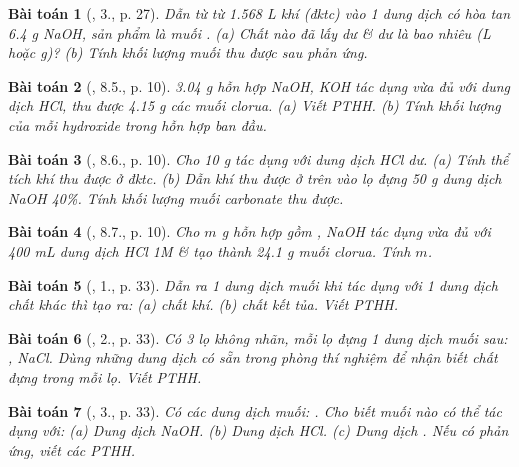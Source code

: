 \documentclass{article}
\newtheorem{baitoan}{Bài toán}
\begin{document}
\begin{baitoan}[\cite{SGK_Hoa_Hoc_9}, 3., p. 27]
	Dẫn từ từ {\rm1.568 L} khí {\rm{}} (đktc) vào 1 dung dịch có hòa tan {\rm6.4 g NaOH}, sản phẩm là muối {\rm{}}. (a) Chất nào đã lấy dư \& dư là bao nhiêu ({\rm L} hoặc {\rm g})? (b) Tính khối lượng muối thu được sau phản ứng.
\end{baitoan}

\begin{baitoan}[\cite{SGK_Hoa_Hoc_9}, 8.5., p. 10]
	{\rm3.04 g} hỗn hợp {\rm NaOH, KOH} tác dụng vừa đủ với dung dịch {\rm HCl}, thu được {\rm4.15 g} các muối clorua. (a) Viết {\rm PTHH}. (b) Tính khối lượng của mỗi hydroxide trong hỗn hợp ban đầu.
\end{baitoan}

\begin{baitoan}[\cite{SGK_Hoa_Hoc_9}, 8.6., p. 10]
	Cho {\rm10 g } tác dụng với dung dịch {\rm HCl} dư. (a) Tính thể tích khí {\rm{}} thu được ở đktc. (b) Dẫn khí {\rm{}} thu được ở trên vào lọ đựng {\rm50 g} dung dịch {\rm NaOH 40\%}. Tính khối lượng muối carbonate thu được.
\end{baitoan}

\begin{baitoan}[\cite{SGK_Hoa_Hoc_9}, 8.7., p. 10]
	Cho $m$ {\rm g} hỗn hợp gồm {\rm{}, NaOH} tác dụng vừa đủ với {\rm400 mL} dung dịch {\rm HCl 1M} \& tạo thành {\rm24.1 g} muối clorua. Tính $m$.
\end{baitoan}

\begin{baitoan}[\cite{SGK_Hoa_Hoc_9}, 1., p. 33]
	Dẫn ra 1 dung dịch muối khi tác dụng với 1 dung dịch chất khác thì tạo ra: (a) chất khí. (b) chất kết tủa. Viết {\rm PTHH}.
\end{baitoan}

\begin{baitoan}[\cite{SGK_Hoa_Hoc_9}, 2., p. 33]
	Có 3 lọ không nhãn, mỗi lọ đựng 1 dung dịch muối sau: {\rm{}, NaCl}. Dùng những dung dịch có sẵn trong phòng thí nghiệm để nhận biết chất đựng trong mỗi lọ. Viết {\rm PTHH}.
\end{baitoan}

\begin{baitoan}[\cite{SGK_Hoa_Hoc_9}, 3., p. 33]
	Có các dung dịch muối: {\rm{}}. Cho biết muối nào có thể tác dụng với: (a) Dung dịch {\rm NaOH}. (b) Dung dịch {\rm HCl}. (c) Dung dịch {\rm{}}. Nếu có phản ứng, viết các PTHH.
\end{baitoan}
\end{document}
